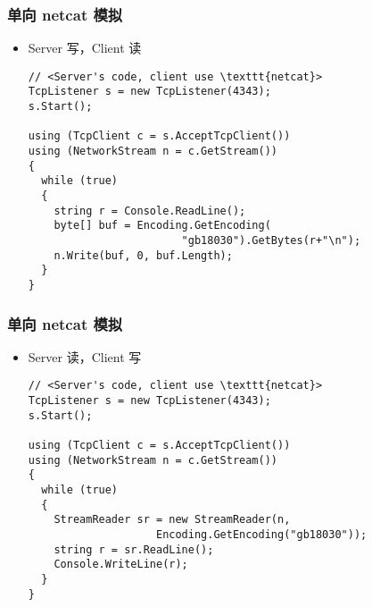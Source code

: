 \begin{frame}[fragile]
\frametitle{单向 netcat 模拟}
\begin{itemize}
\item Server 写，Client 读
\begin{lstlisting}[escapeinside=<>]
// <Server's code, client use \texttt{netcat}>
TcpListener s = new TcpListener(4343);
s.Start();

using (TcpClient c = s.AcceptTcpClient())
using (NetworkStream n = c.GetStream())
{
  while (true)
  {
    string r = Console.ReadLine();
    byte[] buf = Encoding.GetEncoding(
                        "gb18030").GetBytes(r+"\n");
    n.Write(buf, 0, buf.Length);
  }
}
\end{lstlisting}
\end{itemize}
\end{frame}

\begin{frame}[fragile]
\frametitle{单向 netcat 模拟}
\begin{itemize}
\item Server 读，Client 写
\begin{lstlisting}[escapeinside=<>]
// <Server's code, client use \texttt{netcat}>
TcpListener s = new TcpListener(4343);
s.Start();

using (TcpClient c = s.AcceptTcpClient())
using (NetworkStream n = c.GetStream())
{
  while (true)
  {
    StreamReader sr = new StreamReader(n, 
                    Encoding.GetEncoding("gb18030"));
    string r = sr.ReadLine();
    Console.WriteLine(r);
  }
}
\end{lstlisting}
\end{itemize}
\end{frame}





